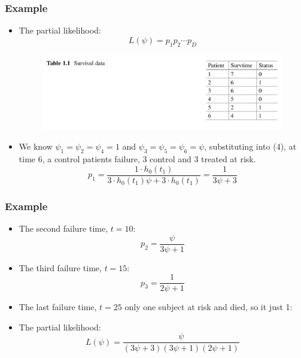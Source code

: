 \documentclass{beamer}
\begin{document}
\pagebreak
\begin{frame}
\frametitle{Example}
\begin{itemize}
\item The partial likelihood:
\begin{equation}
L(\psi) = p_1p_2\cdots p_D
\end{equation}
\begin{figure}[h!]
\includegraphics[scale = .5]{001.png}
\end{figure}
\item We know $\psi_1 = \psi_2 = \psi_4 =1$ and $\psi_3 = \psi_5 = \psi_6 = \psi$, substituting into (4), at time 6, a control patients failure, 3 control and 3 treated at risk.
\begin{equation}
	p_1 = \frac{1\cdot h_0(t_1)}{3\cdot h_0(t_1)\psi +3\cdot h_0(t_1)} = \frac{1}{3\psi+3} 
\end{equation}
\end{itemize}
\end{frame}

\pagebreak
\begin{frame}
\frametitle{Example}
\begin{itemize}
\item The second failure time, $t = 10$:
\begin{equation}
p_2 = \frac{\psi}{3\psi+1} 
\end{equation}
\item The third failure time, $t = 15$:
\begin{equation}
p_3 = \frac{1}{2\psi+1} 
\end{equation}
\item The last failure time, $t = 25$ only one subject at risk and died, so it just 1:
\item  The partial likelihood:
\begin{equation}
L(\psi) = \frac{\psi}{(3\psi+3)(3\psi+1)(2\psi+1)}
\end{equation}
\end{itemize}
\end{frame}
\end{document}

